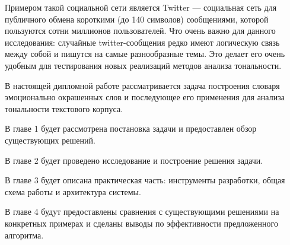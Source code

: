Примером такой социальной сети является Twitter — социальная сеть для публичного
обмена короткими (до 140 символов) сообщениями, которой пользуются сотни
миллионов пользователей. Что очень важно для данного исследования: случайные
twitter-сообщения редко имеют логическую связь между собой и пишутся на самые
разнообразные темы. Это делает его очень удобным для тестирования новых
реализаций методов анализа тональности.

В настоящей дипломной работе рассматривается задача построения словаря
эмоционально окрашенных слов и последующее его применения для анализа
тональности текстового корпуса.

В главе 1 будет рассмотрена постановка задачи и предоставлен обзор существующих
решений.

В главе 2 будет проведено исследование и построение решения задачи.

В главе 3 будет описана практическая часть: инструменты разработки, общая схема
работы и архитектура системы.

В главе 4 будут предоставлены сравнения с существующими решениями на конкретных
примерах и сделаны выводы по эффективности предложенного алгоритма.

\FloatBarrier

